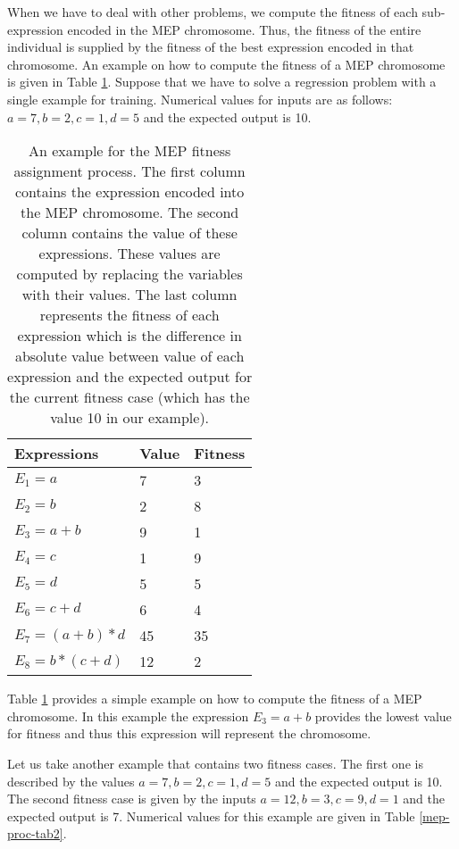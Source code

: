 \documentclass [11pt]{article}
\begin{document}
When we have to deal with other problems, we compute the fitness of each 
sub-expression encoded in the MEP chromosome. Thus, the fitness of the 
entire individual is supplied by the fitness of the best expression encoded 
in that chromosome. An example on how to compute the fitness of a MEP chromosome is given in Table \ref{mep-proc-tab1}. Suppose that we have to solve a regression problem with a single example for training. Numerical values for inputs are as follows: $a = 7, b = 2, c = 1, d = 5$ and the expected output is 10.

\begin{table}
\caption{An example for the MEP fitness assignment process. The first column contains the expression encoded into the MEP chromosome. The second column contains the value of these expressions. These values are computed by replacing the variables with their values. The last column represents the fitness of each expression which is the difference in absolute value between value of each expression and the expected output for the current fitness case (which has the value 10 in our example).}
\label{mep-proc-tab1}
\begin{center}
\begin{tabular}
{p{70pt}p{70pt}p{50pt}}
\hline
Expressions& 
Value&
Fitness \\
\hline
$E_1 = a$&
7&
3\\
$E_2 = b$&
2&
8\\
$E_3 = a+b$&
9&
1\\
$E_4 = c$&
1&
9\\
$E_5 = d$&
5&
5\\
$E_6 = c+d$&
6&
4\\
$E_7 = (a+b)*d$&
45&
35\\
$E_8 = b*(c+d)$&
12&
2\\
\hline
\end{tabular}
\end{center}
\end{table}

Table \ref{mep-proc-tab1} provides a simple example on how to compute the fitness of a MEP chromosome. In this example the expression $E_3 =a+b$ provides the lowest value for fitness and thus this expression will represent the chromosome.

Let us take another example that contains two fitness cases. The first one is described by the values $a = 7, b = 2, c = 1, d = 5$ and the expected output is 10. The second fitness case is given by the inputs $a = 12, b = 3, c = 9, d = 1$ and the expected output is 7. Numerical values for this example are given in Table \ref{mep-proc-tab2}.
\end{document}
